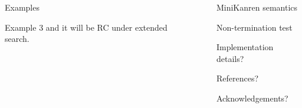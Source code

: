 \documentclass[final]{beamer}
\newlength{\sepwid}
\newlength{\onecolwid}
\begin{document}
\begin{frame}[fragile]
\begin{columns}[t]
\begin{column}{\onecolwid}
\begin{block}{Examples}
\begin{alertblock}{Example 3}
and it will be RC under extended search.

\end{alertblock}

\end{block}

\end{column}


\begin{column}{\sepwid}\end{column}


\begin{column}{\onecolwid}

\begin{block}{MiniKanren semantics}

\end{block}

\begin{block}{Non-termination test}

\end{block}

\begin{block}{Implementation details?}

\end{block}

\begin{block}{References?}

\end{block}

\begin{block}{Acknowledgements?}

\end{block}

\end{column}

\end{columns} %

\end{frame}
\end{document}
